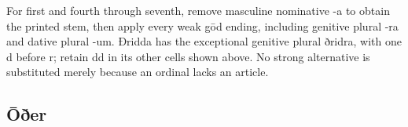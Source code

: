\par\endgroup
For first and fourth through seventh, remove masculine nominative -a to obtain the printed stem, then apply every weak gōd ending, including genitive plural -ra and dative plural -um. Ðridda has the exceptional genitive plural ðridra, with one d before r; retain dd in its other cells shown above. No strong alternative is substituted merely because an ordinal lacks an article.

\subsection*{Ōðer}

